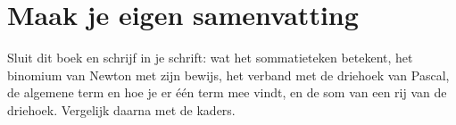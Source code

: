 \begin{oefeningen}

\end{oefeningen}


\begin{oefeningen}






\end{oefeningen}


\ifzelfstudie
\section*{Maak je eigen samenvatting}
Sluit dit boek en schrijf in je schrift: wat het sommatieteken betekent, het binomium van Newton met zijn bewijs, het verband met de driehoek van Pascal, de algemene term en hoe je er één term mee vindt, en de som van een rij van de driehoek. Vergelijk daarna met de kaders.
\fi
